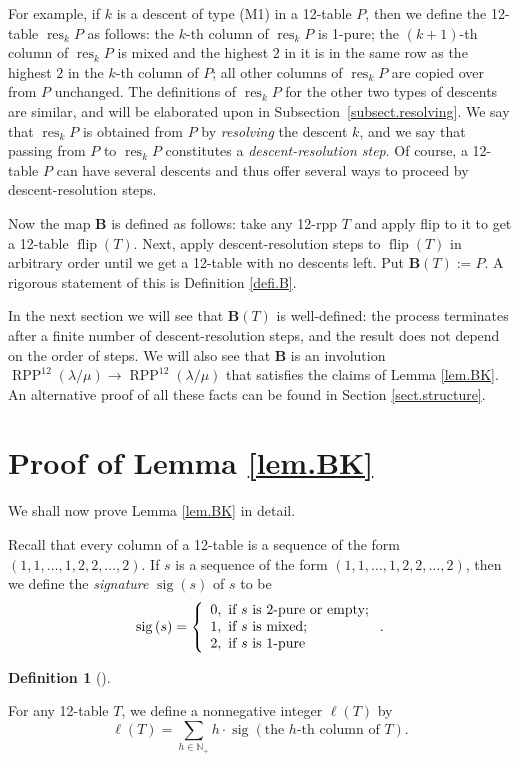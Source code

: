 \documentclass[numbers=enddot,12pt,final,onecolumn,notitlepage]{scrartcl}%
\theoremstyle{definition}
\newtheorem{defi}[theo]{Definition}
\newenvironment{definition}[1][]
{\begin{defi}[#1]\begin{leftbar}}
{\end{leftbar}\end{defi}}
\let\sumnonlimits\sum
\renewcommand{\sum}{\sumnonlimits\limits}
\def\B{{\mathbf{B}}}
\def\OneTwoRPP{{\operatorname{RPP}^{12}\left(  \lambda/\mu\right)}}
\def\flip{{\operatorname{flip}}}
\begin{document}
\def\resk{{\operatorname{res}_{k}}}

For example, if $k$ is a descent of type (M1) in a 12-table $P$, then we define the 12-table $\resk P$ as follows: the $k$-th column of $\resk P$ is 1-pure; the $\left(  k+1\right)  $-th column of $\resk P$ is mixed and the highest $2$ in it is in the same row as the highest $2$ in the $k$-th column of $P$; all other columns of $\resk P$ are
copied over from $P$ unchanged. The definitions of $\resk P$ for the other two types of descents are similar, and will be elaborated upon in Subsection~\ref{subsect.resolving}. We say that $\resk P$ is obtained from $P$ by \textit{resolving} the descent $k$, and we say that passing from $P$ to $\resk P$ constitutes a \textit{descent-resolution step}. Of course, a 12-table $P$ can have several descents and thus offer several ways to proceed by descent-resolution steps.

Now the map $\B$ is defined as follows: take any 12-rpp $T$ and apply flip to it to get a 12-table $\flip(T)$. Next, apply descent-resolution steps to $\flip(T)$ in arbitrary order until we get a 12-table with no descents left. Put $\B(T):=P$. A rigorous statement of this is Definition \ref{defi.B}.

In the next section we will see that $\B(T)$ is well-defined: the process terminates after a finite number of descent-resolution steps, and the result does not depend on the order of steps. We will also see that $\B$ is an involution $\OneTwoRPP\to\OneTwoRPP$ that satisfies the claims of Lemma \ref{lem.BK}. An alternative proof of all these facts can be found in Section \ref{sect.structure}.



\section{\label{sect.proof}Proof of Lemma \ref{lem.BK}}

We shall now prove Lemma \ref{lem.BK} in detail.

Recall that every column of a 12-table
is a sequence of the form $(1,1,\ldots,1,2,2,\ldots,2)$. If $s$ is a sequence of the form $(1,1,\ldots,1,2,2,\ldots,2)$, then we define the
\textit{signature} $\operatorname*{sig}\left(  s\right)
$ of $s$ to be
\[
\operatorname*{sig}\left(  s\right) = \left\{
\begin{array}
[c]{l}%
0,\text{ if }s\text{ is 2-pure or empty;}\\
1,\text{ if }s\text{ is mixed;}\\
2,\text{ if }s\text{ is 1-pure}%
\end{array}
\right.
.
\]
\begin{definition}
 \label{defi.fourtypes}
For any 12-table $T$, we define a nonnegative integer $\ell\left(
T\right)  $ by%
\[
\ell\left(  T\right)  =\sum_{h\in\mathbb{N}_{+}}h\cdot\operatorname*{sig}%
\left(  \text{the }h\text{-th column of }T\right)  .
\]
\end{definition}
\end{document}
